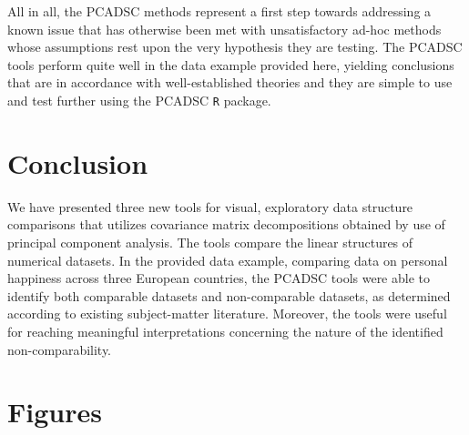 \documentclass[a4paper,12pt]{article}
\begin{document}
All in all, the PCADSC methods represent a first step towards addressing a known issue that has otherwise been met with unsatisfactory ad-hoc methods whose assumptions rest upon the very hypothesis they are testing. The PCADSC tools perform quite well in the data example provided here, yielding conclusions that are in accordance with well-established theories and they are simple to use and test further using the PCADSC \texttt{R} package. 

\section*{Conclusion}

We have presented three new tools for visual, exploratory data structure comparisons that utilizes covariance matrix decompositions obtained by use of principal component analysis. The tools compare the linear structures of numerical datasets. In the provided data example, comparing data on personal happiness across three European countries, the PCADSC tools were able to identify both comparable datasets and non-comparable datasets, as determined according to existing subject-matter literature. Moreover, the tools were useful for reaching meaningful interpretations concerning the nature of the identified non-comparability. 






\newpage

\section*{Figures}
\end{document}
